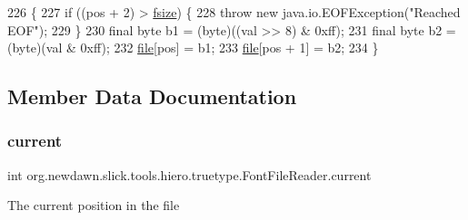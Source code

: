 \begin{DoxyCode}
226                                                                           \{
227         \textcolor{keywordflow}{if} ((pos + 2) > \mbox{\hyperlink{classorg_1_1newdawn_1_1slick_1_1tools_1_1hiero_1_1truetype_1_1_font_file_reader_a247fb2663cf669a7842919c405f41bfe}{fsize}}) \{
228             \textcolor{keywordflow}{throw} \textcolor{keyword}{new} java.io.EOFException(\textcolor{stringliteral}{"Reached EOF"});
229         \}
230         \textcolor{keyword}{final} byte b1 = (byte)((val >> 8) & 0xff);
231         \textcolor{keyword}{final} byte b2 = (byte)(val & 0xff);
232         \mbox{\hyperlink{classorg_1_1newdawn_1_1slick_1_1tools_1_1hiero_1_1truetype_1_1_font_file_reader_ab4c57b8a3e3eba60293c11bf50d7cc42}{file}}[pos] = b1;
233         \mbox{\hyperlink{classorg_1_1newdawn_1_1slick_1_1tools_1_1hiero_1_1truetype_1_1_font_file_reader_ab4c57b8a3e3eba60293c11bf50d7cc42}{file}}[pos + 1] = b2;
234     \}
\end{DoxyCode}


\subsection{Member Data Documentation}
\mbox{\label{classorg_1_1newdawn_1_1slick_1_1tools_1_1hiero_1_1truetype_1_1_font_file_reader_ab082d04b7f0a287496055b8e5f203cb4}} 
\subsubsection{\texorpdfstring{current}{current}}
{\footnotesize\ttfamily int org.\+newdawn.\+slick.\+tools.\+hiero.\+truetype.\+Font\+File\+Reader.\+current\hspace{0.3cm}{\ttfamily [private]}}

The current position in the file \mbox{\label{classorg_1_1newdawn_1_1slick_1_1tools_1_1hiero_1_1truetype_1_1_font_file_reader_ab4c57b8a3e3eba60293c11bf50d7cc42}} 
